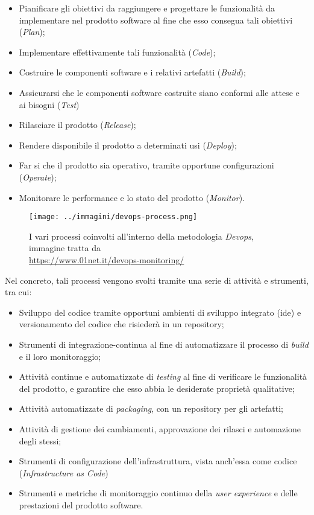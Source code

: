 \begin{itemize}
    \item Pianificare gli obiettivi da raggiungere e progettare le funzionalità da implementare nel prodotto software al fine che esso consegua tali obiettivi (\textit{Plan});
    \item Implementare effettivamente tali funzionalità (\textit{Code});
    \item Costruire le componenti software e i relativi artefatti (\textit{Build});
    \item Assicurarsi che le componenti software costruite siano conformi alle attese e ai bisogni (\textit{Test})
    \item Rilasciare il prodotto (\textit{Release});
    \item Rendere disponibile il prodotto a determinati usi (\textit{Deploy});
    \item Far si che il prodotto sia operativo, tramite opportune configurazioni (\textit{Operate});
    \item Monitorare le performance e lo stato del prodotto (\textit{Monitor}).
\end{itemize}

\begin{figure}[H]
    \capstart
    \centering
    \texttt{[image: ../immagini/devops-process.png]}
    \caption{I vari processi coinvolti all'interno della metodologia \textit{Devops}, immagine tratta da \\ \url{https://www.01net.it/devops-monitoring/}}
\end{figure}

Nel concreto, tali processi vengono svolti tramite una serie di attività e strumenti, tra cui:

\begin{itemize}
    \item Sviluppo del codice tramite opportuni ambienti di sviluppo integrato (\gls{ide}) e versionamento del codice che risiederà in un \gls{repository};
    \item Strumenti di \gls{integrazione-continua} al fine di automatizzare il processo di \textit{\gls{build}} e il loro monitoraggio;
    \item Attività continue e automatizzate di \textit{testing} al fine di verificare le funzionalità del prodotto, e garantire che esso abbia le desiderate proprietà qualitative; 
    \item Attività automatizzate di \textit{packaging}, con un \gls{repository} per gli artefatti;
    \item Attività di gestione dei cambiamenti, approvazione dei rilasci e automazione degli stessi;
    \item Strumenti di configurazione dell'infrastruttura, vista anch'essa come codice (\textit{Infrastructure as Code})
    \item Strumenti e metriche di monitoraggio continuo della \textit{user experience} e delle prestazioni del prodotto software.
\end{itemize}

